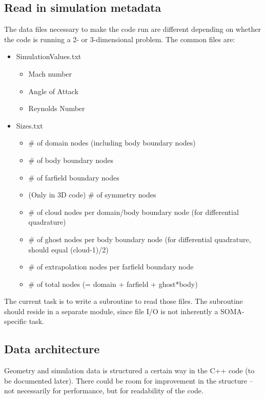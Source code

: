 \documentclass[12pt]{article}
\begin{document}
    \subsection*{Read in simulation metadata}
        The data files necessary to make the code run are different depending on whether the code is running a 2- or 3-dimensional problem. The common files are:
        \begin{itemize}
            \item SimulationValues.txt
            \begin{itemize}
                \item Mach number
                \item Angle of Attack
                \item Reynolds Number
            \end{itemize}
            \item Sizes.txt
            \begin{itemize}
                \item \# of domain nodes (including body boundary nodes)
                \item \# of body boundary nodes
                \item \# of farfield boundary nodes
                \item (Only in 3D code) \# of symmetry nodes
                \item \# of cloud nodes per domain/body boundary node (for differential quadrature)
                \item \# of ghost nodes per body boundary node (for differential quadrature, should equal (cloud-1)/2)
                \item \# of extrapolation nodes per farfield boundary node
                \item \# of total nodes (= domain + farfield + ghost*body)
            \end{itemize}
        \end{itemize}
    
    The current task is to write a subroutine to read those files. The subroutine should reside in a separate module, since file I/O is not inherently a SOMA-specific task.

    \subsection*{Data architecture}
        Geometry and simulation data is structured a certain way in the C++ code (to be documented later). There could be room for improvement in the structure -- not necessarily for performance, but for readability of the code.
\end{document}

